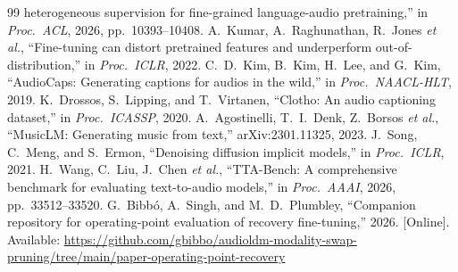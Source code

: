 {\begin{thebibliography}{99}
heterogeneous supervision for fine-grained language-audio pretraining,'' in \emph{Proc.\ ACL}, 2026,
pp.~10393--10408.
 A.~Kumar, A.~Raghunathan, R.~Jones \emph{et al.}, ``Fine-tuning
can distort pretrained features and underperform out-of-distribution,'' in \emph{Proc.\ ICLR}, 2022.
 C.~D.~Kim, B.~Kim, H.~Lee, and G.~Kim, ``AudioCaps: Generating captions
for audios in the wild,'' in \emph{Proc.\ NAACL-HLT}, 2019.
 K.~Drossos, S.~Lipping, and T.~Virtanen, ``Clotho: An audio captioning dataset,'' in \emph{Proc.\ ICASSP}, 2020.
 A.~Agostinelli, T.~I.~Denk, Z.~Borsos \emph{et al.}, ``MusicLM:
Generating music from text,'' arXiv:2301.11325, 2023.
 J.~Song, C.~Meng, and S.~Ermon, ``Denoising diffusion implicit models,'' in
\emph{Proc.\ ICLR}, 2021.
 H.~Wang, C.~Liu, J.~Chen \emph{et al.}, ``TTA-Bench: A comprehensive benchmark for evaluating text-to-audio models,'' in \emph{Proc.\ AAAI}, 2026, pp.~33512--33520.
 G.~Bibb\'o, A.~Singh, and M.~D.~Plumbley, ``Companion repository for operating-point evaluation of recovery fine-tuning,'' 2026. [Online]. Available: \url{https://github.com/gbibbo/audioldm-modality-swap-pruning/tree/main/paper-operating-point-recovery}
\end{thebibliography}}


